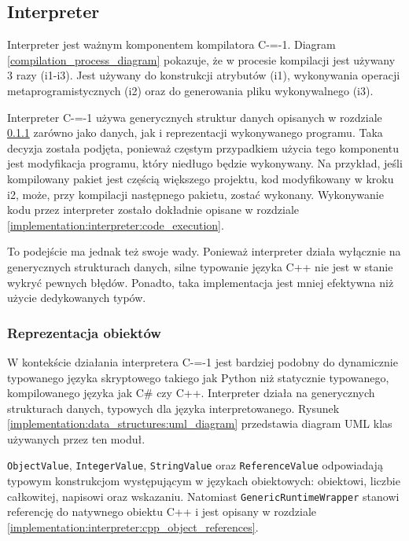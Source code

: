 \subsection{Interpreter}
\label{interpreter}

Interpreter jest ważnym komponentem kompilatora C-=-1.
Diagram \ref{compilation_process_diagram} pokazuje, że w procesie kompilacji jest używany 3 razy (i1-i3).
Jest używany do konstrukcji atrybutów (i1), wykonywania operacji metaprogramistycznych (i2) oraz do generowania pliku wykonywalnego (i3).

Interpreter C-=-1 używa generycznych struktur danych opisanych w rozdziale \ref{implementation:interpreter:object_representation} zarówno jako danych, jak i reprezentacji wykonywanego programu.
Taka decyzja została podjęta, ponieważ częstym przypadkiem użycia tego komponentu jest modyfikacja programu, który niedługo będzie wykonywany.
Na przykład, jeśli kompilowany pakiet jest częścią większego projektu, kod modyfikowany w kroku i2, może, przy kompilacji następnego pakietu, zostać wykonany.
Wykonywanie kodu przez interpreter zostało dokładnie opisane w rozdziale \ref{implementation:interpreter:code_execution}.

To podejście ma jednak też swoje wady.
Ponieważ interpreter działa wyłącznie na generycznych strukturach danych, silne typowanie języka C++ nie jest w stanie wykryć pewnych błędów.
Ponadto, taka implementacja jest mniej efektywna niż użycie dedykowanych typów.

\subsubsection{Reprezentacja obiektów}
\label{implementation:interpreter:object_representation}

W kontekście działania interpretera C-=-1 jest bardziej podobny do dynamicznie typowanego języka skryptowego takiego jak Python \cite{van1995python} niż statycznie typowanego, kompilowanego języka jak C\# czy C++.
Interpreter działa na generycznych strukturach danych, typowych dla języka interpretowanego.
Rysunek \ref{implementation:data_structures:uml_diagram} przedstawia diagram UML klas używanych przez ten moduł.

\lstinline{ObjectValue}, \lstinline{IntegerValue}, \lstinline{StringValue} oraz \lstinline{ReferenceValue} odpowiadają typowym konstrukcjom występującym w językach obiektowych: obiektowi, liczbie całkowitej, napisowi oraz wskazaniu.
Natomiast \lstinline{GenericRuntimeWrapper} stanowi referencję do natywnego obiektu C++ i jest opisany w rozdziale \ref{implementation:interpreter:cpp_object_references}.


